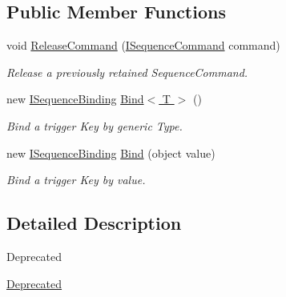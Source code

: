 \subsection*{Public Member Functions}
\begin{DoxyCompactItemize}
\item 
void \hyperlink{interfacestrange_1_1extensions_1_1sequencer_1_1api_1_1_i_sequencer_a82319428df4be5e5059493c25c0e6aa5}{Release\-Command} (\hyperlink{interfacestrange_1_1extensions_1_1sequencer_1_1api_1_1_i_sequence_command}{I\-Sequence\-Command} command)
\begin{DoxyCompactList}\small\item\em Release a previously retained Sequence\-Command. \end{DoxyCompactList}\item 
\hypertarget{interfacestrange_1_1extensions_1_1sequencer_1_1api_1_1_i_sequencer_a89d1866b3c64fe9d95c62c85bfb5e252}{new \hyperlink{interfacestrange_1_1extensions_1_1sequencer_1_1api_1_1_i_sequence_binding}{I\-Sequence\-Binding} \hyperlink{interfacestrange_1_1extensions_1_1sequencer_1_1api_1_1_i_sequencer_a89d1866b3c64fe9d95c62c85bfb5e252}{Bind$<$ T $>$} ()}\label{interfacestrange_1_1extensions_1_1sequencer_1_1api_1_1_i_sequencer_a89d1866b3c64fe9d95c62c85bfb5e252}

\begin{DoxyCompactList}\small\item\em Bind a trigger Key by generic Type. \end{DoxyCompactList}\item 
\hypertarget{interfacestrange_1_1extensions_1_1sequencer_1_1api_1_1_i_sequencer_a9c5fe9ddda2a85d8d49c7f8a4da00d7f}{new \hyperlink{interfacestrange_1_1extensions_1_1sequencer_1_1api_1_1_i_sequence_binding}{I\-Sequence\-Binding} \hyperlink{interfacestrange_1_1extensions_1_1sequencer_1_1api_1_1_i_sequencer_a9c5fe9ddda2a85d8d49c7f8a4da00d7f}{Bind} (object value)}\label{interfacestrange_1_1extensions_1_1sequencer_1_1api_1_1_i_sequencer_a9c5fe9ddda2a85d8d49c7f8a4da00d7f}

\begin{DoxyCompactList}\small\item\em Bind a trigger Key by value. \end{DoxyCompactList}\end{DoxyCompactItemize}


\subsection{Detailed Description}
\begin{DoxyRefDesc}{Deprecated}
\item[\hyperlink{deprecated__deprecated000003}{Deprecated}]\end{DoxyRefDesc}



